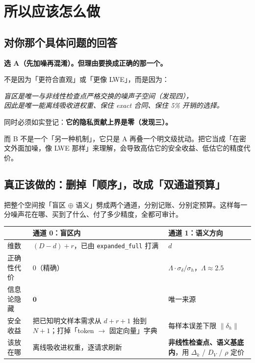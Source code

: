 \documentclass[UTF8, fontset=macnew, 11pt]{ctexart}
\begin{document}
\section{所以应该怎么做}\label{sec:opinion}

\subsection{对你那个具体问题的回答}

\begin{plainbox}
\textbf{选 A（先加噪再混淆）。但理由要换成正确的那一个。}

不是因为「更符合直观」或「更像 LWE」，而是因为：

\begin{center}
\emph{盲区是唯一与非线性检查点严格交换的噪声子空间（发现四），\\
因此是唯一能离线吸收进权重、保住 exact 合同、保住 5\% 开销的选择。}
\end{center}

同时必须如实登记：\textbf{它的隐私贡献上界是零（发现三）。}

而 B 不是一个「另一种机制」，它只是 A 再叠一个明文级扰动。把它当成「在密文外面加噪，像 LWE 那样」来理解，会导致高估它的安全收益、低估它的精度代价。
\end{plainbox}

\subsection{真正该做的：删掉「顺序」，改成「双通道预算」}

\begin{plainbox}
把整个空间按「盲区 $\oplus$ 语义」劈成两个通道，分别记账、分别定预算。这样每一分噪声花在哪、买到了什么、付了多少精度，全都可审计。
\end{plainbox}

\begin{center}
\small
\renewcommand{\arraystretch}{1.35}
\begin{tabular}{@{}L{2.3cm} L{5.4cm} L{5.4cm}@{}}
\toprule
& \textbf{通道 0：盲区内} & \textbf{通道 1：语义方向} \\
\midrule
维数 & $(D-d)+r$，已由 \texttt{expanded\_full} 打满 & $d$ \\
正确性代价 & $0$（精确） & $\Lambda\cdot\sigma_\delta/\sigma_h$，$\Lambda\approx2.5$ \\
信息论隐藏 & $\mathbf 0$ & 唯一来源 \\
安全收益 & 把已知明文样本需求从 $d{+}r{+}1$ 抬到 $N{+}1$；打掉「token $\to$ 固定向量」字典 & 每样本误差下限 $\|\delta_h\|$ \\
该放在哪 & 离线吸收进权重，逐请求刷新 & \textbf{非线性检查点、语义基底内}，用 $\Delta_k$ / $D_V$ / $\rho$ 定价 \\
\bottomrule
\end{tabular}
\end{center}
\end{document}
